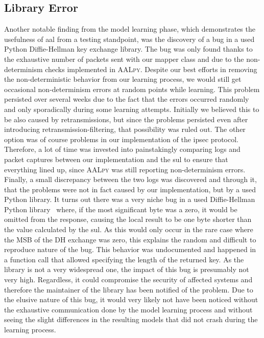 \subsection{Library Error} \label{subsec:liberror}
Another notable finding from the model learning phase, which demonstrates the usefulness of \ac{aal} from a testing standpoint, was the discovery of a bug in a used Python Diffie-Hellman key exchange library. The bug was only found thanks to the exhaustive number of packets sent with our mapper class and due to the non-determinism checks implemented in \textsc{AALpy}. Despite our best efforts in removing the non-deterministic behavior from our learning process, we would still get occasional non-determinism errors at random points while learning. This problem persisted over several weeks due to the fact that the errors occurred randomly and only sporadically during some learning attempts. Initially we believed this to be also caused by retransmissions, but since the problems persisted even after introducing retransmission-filtering, that possibility was ruled out. The other option was of course problems in our implementation of the \ac{ipsec} protocol. Therefore, a lot of time was invested into painstakingly comparing logs and packet captures between our implementation and the \ac{sul} to ensure that everything lined up, since \textsc{AALpy} was still reporting non-determinism errors. Finally, a small discrepancy between the two logs was discovered and through it, that the problems were not in fact caused by our implementation, but by a used Python library. It turns out there was a very niche bug in a used Diffie-Hellman Python library~\cite{topdappdh} where, if the most significant byte was a zero, it would be omitted from the response, causing the local result to be one byte shorter than the value calculated by the \ac{sul}. As this would only occur in the rare case where the MSB of the DH exchange was zero, this explains the random and difficult to reproduce nature of the bug. This behavior was undocumented and happened in a function call that allowed specifying the length of the returned key. As the library is not a very widespread one, the impact of this bug is presumably not very high. Regardless, it could compromise the security of affected systems and therefore the maintainer of the library has been notified of the problem. Due to the elusive nature of this bug, it would very likely not have been noticed without the exhaustive communication done by the model learning process and without seeing the slight differences in the resulting models that did not crash during the learning process.

